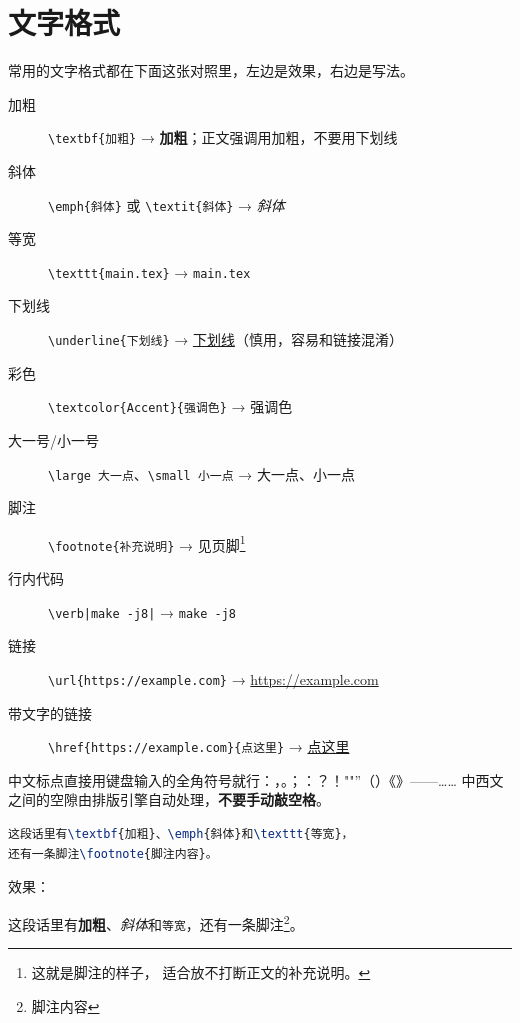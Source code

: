 \section{文字格式}
\label{sec:00-text}

常用的文字格式都在下面这张对照里，左边是效果，右边是写法。

\begin{description}
  \item[加粗] \verb|\textbf{加粗}| → \textbf{加粗}；正文强调用加粗，不要用下划线
  \item[斜体] \verb|\emph{斜体}| 或 \verb|\textit{斜体}| → \emph{斜体}
  \item[等宽] \verb|\texttt{main.tex}| → \texttt{main.tex}
  \item[下划线] \verb|\underline{下划线}| → \underline{下划线}（慎用，容易和链接混淆）
  \item[彩色] \verb|\textcolor{Accent}{强调色}| → \textcolor{Accent}{强调色}
  \item[大一号/小一号] \verb|\large 大一点|、\verb|\small 小一点| →
    {\large 大一点}、{\small 小一点}
  \item[脚注] \verb|\footnote{补充说明}| → 见页脚\footnote{这就是脚注的样子，
    适合放不打断正文的补充说明。}
  \item[行内代码] \texttt{\textbackslash verb|make -j8|} → \verb|make -j8|
  \item[链接] \verb|\url{https://example.com}| → \url{https://example.com}
  \item[带文字的链接] \verb|\href{https://example.com}{点这里}| →
    \href{https://example.com}{点这里}
\end{description}

中文标点直接用键盘输入的全角符号就行：，。；：？！""''（）《》——……
中西文之间的空隙由排版引擎自动处理，\textbf{不要手动敲空格}。

\begin{lstlisting}[language=TeX]
这段话里有\textbf{加粗}、\emph{斜体}和\texttt{等宽}，
还有一条脚注\footnote{脚注内容}。
\end{lstlisting}

效果：

这段话里有\textbf{加粗}、\emph{斜体}和\texttt{等宽}，还有一条脚注\footnote{脚注内容}。

